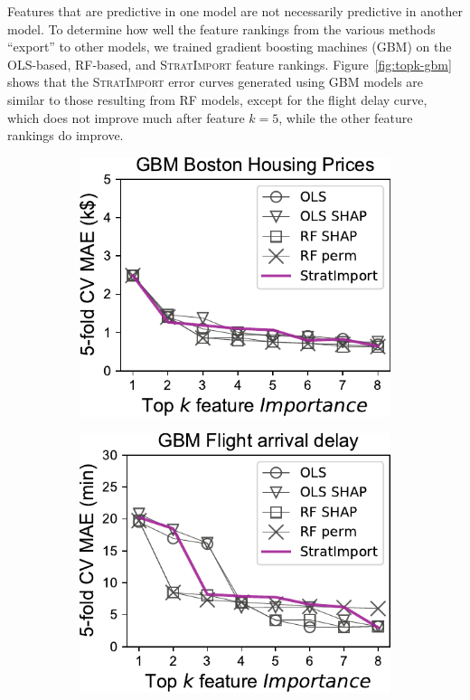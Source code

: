 \documentclass[11pt]{article}
\newcommand{\figref}[1]{Figure~\ref{#1}}
\newcommand{\simpo}{\fontfamily{cmr}\textsc{\small StratImport}}
\begin{document}
Features that are predictive in one model are not necessarily predictive in another model.  To determine how well the feature rankings from the various methods ``export'' to other models, we trained gradient boosting machines (GBM) on the OLS-based, RF-based, and \simpo{} feature rankings.  \figref{fig:topk-gbm} shows that the \simpo{} error curves generated using GBM models are similar to those resulting from RF models, except for the flight delay curve, which does not improve much after feature $k=5$, while the other feature rankings do improve. 

\begin{figure}
\centering
\begin{subfigure}{.245\textwidth}
    \centering
\includegraphics[scale=0.45]{images/boston-topk-GBM-Importance.pdf}
\subcaption{}
\end{subfigure}%
\hfill
\begin{subfigure}{.245\textwidth}
    \centering
\includegraphics[scale=0.45]{images/flights-topk-GBM-Importance.pdf}

\end{subfigure}
\end{figure}
\end{document}
